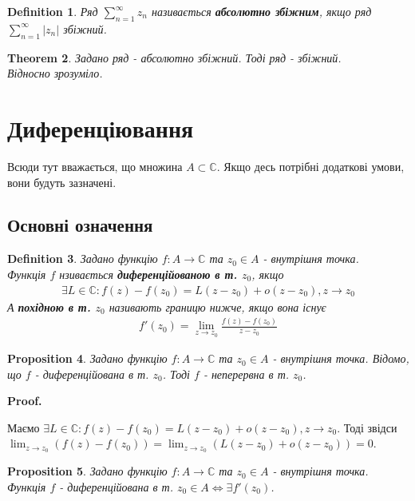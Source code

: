 \documentclass[a4paper, 10pt]{article}
\makeatletter
\def\qed{$\blacksquare$}
\theoremstyle{theoremdd}
\newtheorem{theorem}{Theorem}[subsection]
\theoremstyle{theoremdd}
\newtheorem{definition}[theorem]{Definition}
\theoremstyle{theoremdd}
\theoremstyle{theoremdd}
\theoremstyle{theoremdd}
\newtheorem{proposition}[theorem]{Proposition}
\theoremstyle{theoremdd}
\theoremstyle{theoremdd}
\theoremstyle{theoremdd}
\renewenvironment{proof}[1][Proof.\\]{\par
\pushQED{\hfill \qed}%
\normalfont \topsep6\p@\@plus6\p@\relax
\trivlist
\item\relax
{\bfseries
#1\@addpunct{.}}\hspace\labelsep\ignorespaces
}{%
\popQED\endtrivlist\@endpefalse
}
\makeatother
\begin{document}
\begin{definition}
Ряд $\displaystyle\sum_{n=1}^\infty z_n$ називається \textbf{абсолютно збіжним}, якщо ряд $\displaystyle\sum_{n=1}^\infty |z_n|$ збіжний.
\end{definition}

\begin{theorem}
Задано ряд - абсолютно збіжний. Тоді ряд - збіжний.\\
\textit{Відносно зрозуміло.}
\end{theorem}

\newpage
	
\section{Диференціювання}
Всюди тут вважається, що множина $A \subset \mathbb{C}$. Якщо десь потрібні додаткові умови, вони будуть зазначені.

\subsection{Основні означення}
\begin{definition}
Задано функцію $f: A \to \mathbb{C}$ та $z_0 \in A$ - внутрішня точка.\\
Функція $f$ нзивається \textbf{диференційованою в т. $z_0$}, якщо
\begin{align*}
	\exists L \in \mathbb{C}: f(z)-f(z_0)=L(z-z_0) + o(z-z_0), z \to z_0
\end{align*}
А \textbf{похідною в т. $z_0$} називають границю нижче, якщо вона існує
\begin{align*}
	f'(z_0) = \lim_{z \to z_0} \frac{f(z)-f(z_0)}{z-z_0}
\end{align*}
\end{definition}

\begin{proposition}
Задано функцію $f: A \to \mathbb{C}$ та $z_0 \in A$ - внутрішня точка. Відомо, що $f$ - диференційована в т. $z_0$. Тоді $f$ - неперервна в т. $z_0$.
\end{proposition}

\begin{proof}
Маємо $\exists L \in \mathbb{C}: f(z) - f(z_0) = L(z-z_0) + o(z-z_0),z \to z_0$. Тоді звідси\\
$\displaystyle\lim_{z \to z_0} (f(z)-f(z_0)) = \lim_{z \to z_0} (L(z-z_0) + o(z-z_0)) = 0$.
\end{proof}
	
\begin{proposition}
Задано функцію $f: A \to \mathbb{C}$ та $z_0 \in A$ - внутрішня точка.\\
Функція $f$ - диференційована в т. $z_0 \in A \iff \exists f'(z_0)$.
\end{proposition}
\end{document}
